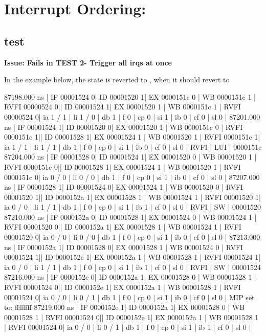 \section{Interrupt Ordering: }

\subsection{test}
\textbf{Issue: Fails in TEST 2- Trigger all irqs at once}

In the example below, the state is reverted to , when it should revert to 

\begin{terminal}
   87198.000 ns | IF 00001524  0| ID 00001520 1| EX 0000151c 0 | WB 0000151c 1 | RVFI 00000524 0|| ID 00001524  1| EX 00001520 1 | WB 0000151c 1 | RVFI 00000524 0| ia 1 / 1 | li 1 / 0 | db 1 | f 0 | cp 0 | si 1 | ib 0 | cf 0 | sl 0 |
   87201.000 ns | IF 00001524  1| ID 00001520 0| EX 00001520 1 | WB 0000151c 0 | RVFI 0000151c 1|| ID 00001528  1| EX 00001524 1 | WB 00001520 1 | RVFI 0000151c 1| ia 1 / 1 | li 1 / 1 | db 1 | f 0 | cp 0 | si 1 | ib 0 | cf 0 | sl 0 | RVFI | LUI      | 0000151c
   87204.000 ns | IF 00001528  0| ID 00001524 1| EX 00001520 0 | WB 00001520 1 | RVFI 0000151c 0|| ID 00001528  1| EX 00001524 1 | WB 00001520 1 | RVFI 0000151c 0| ia 0 / 0 | li 0 / 0 | db 1 | f 0 | cp 0 | si 1 | ib 0 | cf 0 | sl 0 |
   87207.000 ns | IF 00001528  1| ID 00001524 0| EX 00001524 1 | WB 00001520 0 | RVFI 00001520 1|| ID 0000152a  1| EX 00001528 1 | WB 00001524 1 | RVFI 00001520 1| ia 0 / 0 | li 1 / 1 | db 1 | f 0 | cp 0 | si 1 | ib 1 | cf 0 | sl 0 | RVFI | SW       | 00001520
   87210.000 ns | IF 0000152a  0| ID 00001528 1| EX 00001524 0 | WB 00001524 1 | RVFI 00001520 0|| ID 0000152a  1| EX 00001528 1 | WB 00001524 1 | RVFI 00001520 0| ia 0 / 0 | li 0 / 0 | db 1 | f 0 | cp 0 | si 1 | ib 0 | cf 0 | sl 0 |
   87213.000 ns | IF 0000152a  1| ID 00001528 0| EX 00001528 1 | WB 00001524 0 | RVFI 00001524 1|| ID 0000152e  1| EX 0000152a 1 | WB 00001528 1 | RVFI 00001524 1| ia 0 / 0 | li 1 / 1 | db 1 | f 0 | cp 0 | si 1 | ib 1 | cf 0 | sl 0 | RVFI | SW       | 00001524
   87216.000 ns | IF 0000152e  0| ID 0000152a 1| EX 00001528 0 | WB 00001528 1 | RVFI 00001524 0|| ID 0000152e  1| EX 0000152a 1 | WB 00001528 1 | RVFI 00001524 0| ia 0 / 0 | li 0 / 1 | db 1 | f 0 | cp 0 | si 1 | ib 0 | cf 0 | sl 0 |
MIP set to: ffffffff
   87219.000 ns | IF 0000152e  1| ID 0000152a 1| EX 00001528 0 | WB 00001528 1 | RVFI 00001524 0|| ID 0000152e  1| EX 0000152a 1 | WB 00001528 1 | RVFI 00001524 0| ia 0 / 0 | li 0 / 1 | db 1 | f 0 | cp 0 | si 1 | ib 1 | cf 0 | sl 0 |

\end{terminal}
